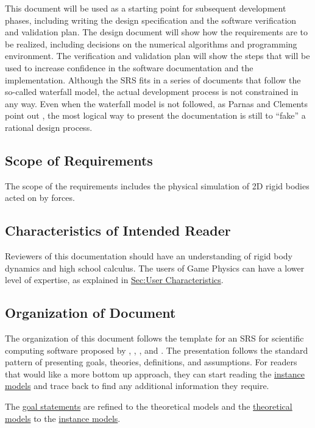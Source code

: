 \documentclass[12pt]{article}
\begin{document}
This document will be used as a starting point for subsequent development phases, including writing the design specification and the software verification and validation plan. The design document will show how the requirements are to be realized, including decisions on the numerical algorithms and programming environment. The verification and validation plan will show the steps that will be used to increase confidence in the software documentation and the implementation. Although the SRS fits in a series of documents that follow the so-called waterfall model, the actual development process is not constrained in any way. Even when the waterfall model is not followed, as Parnas and Clements point out \cite{parnasClements1986}, the most logical way to present the documentation is still to ``fake'' a rational design process.

\subsection{Scope of Requirements}
\label{Sec:ReqsScope}
The scope of the requirements includes the physical simulation of 2D rigid bodies acted on by forces.

\subsection{Characteristics of Intended Reader}
\label{Sec:ReaderChars}
Reviewers of this documentation should have an understanding of rigid body dynamics and high school calculus. The users of Game Physics can have a lower level of expertise, as explained in \hyperref[Sec:UserChars]{Sec:User Characteristics}.

\subsection{Organization of Document}
\label{Sec:DocOrg}
The organization of this document follows the template for an SRS for scientific computing software proposed by \cite{koothoor2013}, \cite{smithLai2005}, \cite{smithEtAl2007}, and \cite{smithKoothoor2016}. The presentation follows the standard pattern of presenting goals, theories, definitions, and assumptions. For readers that would like a more bottom up approach, they can start reading the \hyperref[Sec:IMs]{instance models} and trace back to find any additional information they require.

The \hyperref[Sec:GoalStmt]{goal statements} are refined to the theoretical models and the \hyperref[Sec:TMs]{theoretical models} to the \hyperref[Sec:IMs]{instance models}.
\end{document}
